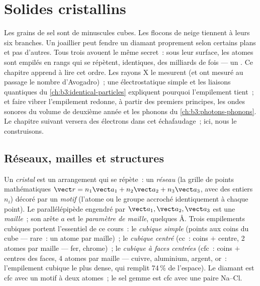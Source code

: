 \chapter{Solides cristallins}\label{ch:b3:crystalline-solids}


Les grains de sel sont de minuscules cubes. Les flocons de neige
tiennent à leurs six branches. Un joaillier peut fendre un diamant
proprement selon certains plans et pas d'autres. Tous trois avouent le
même secret~: sous leur surface, les atomes sont empilés en rangs qui
se répètent, identiques, des milliards de fois --- un \emph{}.
Ce chapitre apprend à lire cet ordre. Les rayons X le mesurent (et ont
mesuré au passage le nombre d'Avogadro)~; une électrostatique simple
et les liaisons quantiques du \cref{ch:b3:identical-particles}
expliquent pourquoi l'empilement tient~; et faire vibrer l'empilement
redonne, à partir des premiers principes, les ondes sonores du volume
de deuxième année et les phonons du \cref{ch:b3:photons-phonons}. Le
chapitre suivant versera des électrons dans cet échafaudage~; ici,
nous le construisons.

\section{Réseaux, mailles et structures}

\begin{definition}\label{def:b3:crystalline-solids:lattice}
Un \emph{cristal} est un arrangement qui se répète~: un \emph{réseau}
(la grille de points mathématiques $\vect r = n_1\vect a_1 + n_2\vect a_2
+ n_3\vect a_3$, avec des entiers $n_i$) décoré par un \emph{motif}
(l'atome ou le groupe accroché identiquement à chaque point). Le
parallélépipède engendré par $\vect a_1, \vect a_2, \vect a_3$ est une
\emph{maille}~; son arête $a$ est le \emph{paramètre de maille},
quelques \unit{\angstrom}. Trois empilements cubiques portent
l'essentiel de ce cours~: le \emph{cubique simple} (points aux coins du
cube --- rare~: un atome par maille)~; le \emph{cubique centré} (cc~:
coins $+$ centre, 2 atomes par maille --- fer, chrome)~; le
\emph{cubique à faces centrées} (cfc~: coins $+$ centres des faces, 4
atomes par maille --- cuivre, aluminium, argent, or~: l'empilement
cubique le plus dense, qui remplit 74\,\% de l'espace). Le diamant est
cfc avec un motif à deux atomes~; le sel gemme est cfc avec une paire
Na--Cl.
\end{definition}

